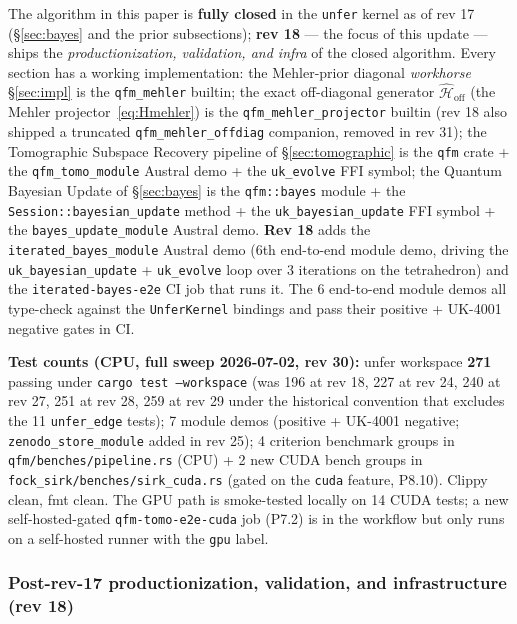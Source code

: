 \documentclass[11pt, a4paper]{article}
\newcommand{\Hgen}{\hat{\mathcal{H}}}
\begin{document}
The algorithm in this paper is \textbf{fully closed} in the
\texttt{unfer} kernel as of rev 17 (\S\ref{sec:bayes} and the
prior subsections); \textbf{rev 18} --- the focus of this
update --- ships the \emph{productionization, validation, and
infra} of the closed algorithm. Every section has a working
implementation: the Mehler-prior diagonal \emph{workhorse}
\S\ref{sec:impl} is the \texttt{qfm\_mehler} builtin; the exact
off-diagonal generator $\Hgen_{\mathrm{off}}$ (the Mehler
projector~\eqref{eq:Hmehler}) is the
\texttt{qfm\_mehler\_projector} builtin (rev 18 also shipped a
truncated \texttt{qfm\_mehler\_offdiag} companion, removed in rev
31); the Tomographic Subspace
Recovery pipeline of \S\ref{sec:tomographic} is the
\texttt{qfm} crate + the \texttt{qfm\_tomo\_module} Austral
demo + the \texttt{uk\_evolve} FFI symbol; the Quantum Bayesian
Update of \S\ref{sec:bayes} is the \texttt{qfm::bayes} module +
the \texttt{Session::bayesian\_update} method + the
\texttt{uk\_bayesian\_update} FFI symbol + the
\texttt{bayes\_update\_module} Austral demo. \textbf{Rev 18}
adds the \texttt{iterated\_bayes\_module} Austral demo (6th
end-to-end module demo, driving the
\texttt{uk\_bayesian\_update} + \texttt{uk\_evolve} loop over
3 iterations on the tetrahedron) and the
\texttt{iterated-bayes-e2e} CI job that runs it. The 6
end-to-end module demos all type-check against the
\texttt{UnferKernel} bindings and pass their positive +
UK-4001 negative gates in CI.

\textbf{Test counts (CPU, full sweep 2026-07-02, rev 30):}
unfer workspace \textbf{271} passing under \texttt{cargo test --workspace}
(was 196 at rev 18, 227 at rev 24, 240 at rev 27, 251 at rev 28,
259 at rev 29 under the historical
convention that excludes the 11 \texttt{unfer\_edge} tests); 7 module demos
(positive + UK-4001 negative; \texttt{zenodo\_store\_module} added in
rev 25); 4 criterion benchmark groups in
\texttt{qfm/benches/pipeline.rs} (CPU) + 2 new CUDA bench
groups in \texttt{fock\_sirk/benches/sirk\_cuda.rs} (gated on
the \texttt{cuda} feature, P8.10). Clippy clean, fmt clean. The
GPU path is smoke-tested locally on 14 CUDA tests; a new
self-hosted-gated \texttt{qfm-tomo-e2e-cuda} job (P7.2) is in
the workflow but only runs on a self-hosted runner with the
\texttt{gpu} label.

\subsubsection*{Post-rev-17 productionization, validation, and infrastructure (rev 18)}
\end{document}
